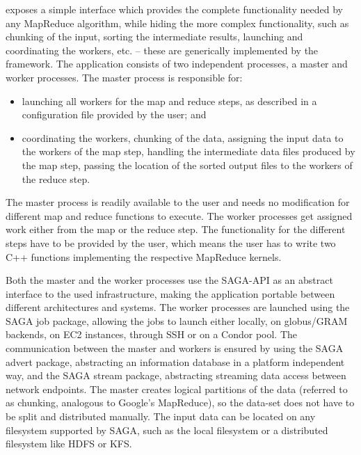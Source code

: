 \documentclass[3p,twocolumn]{elsarticle}
\begin{document}
\smr exposes a simple interface which provides the complete
functionality needed by any MapReduce algorithm, while hiding the more
complex functionality, such as chunking of the input, sorting the
intermediate results, launching and coordinating the workers, etc. --
these are generically implemented by the framework.  The application
consists of two independent processes, a master and worker processes.
The master process is responsible for:

\begin{itemize}
\item launching all workers for the map and reduce steps, as described
  in a configuration file provided by the user; and
\item coordinating the workers, chunking of the
  data, assigning the input data to the workers of the map step,
  handling the intermediate data files produced by the map step, 
  passing the location of the sorted output files to the workers of the
  reduce step.  
\end{itemize}

The master process is readily available to the user and needs no
modification for different map and reduce functions to execute.  The
worker processes get assigned work either from the map or the reduce
step. The functionality for the different steps have to be provided by
the user, which means the user has to write two C++ functions
implementing the respective MapReduce kernels.

Both the master and the worker processes use the SAGA-API as an
abstract interface to the used infrastructure, making the application
portable between different architectures and systems.  The worker
processes are launched using the SAGA job package, allowing the jobs
to launch either locally, on globus/GRAM backends, on EC2 instances, through SSH
or on a Condor pool. The communication between the master and workers
is ensured by using the SAGA advert package, abstracting an
information database in a platform independent way, and the SAGA stream
package, abstracting streaming data access between network endpoints.
The master creates logical partitions of the data (referred to as chunking,
analogous to Google's MapReduce), so the data-set does not have to be split
and distributed manually.  The input data can be located on any filesystem
supported by SAGA, such as the local filesystem or a distributed filesystem
like HDFS or KFS. 
\end{document}
